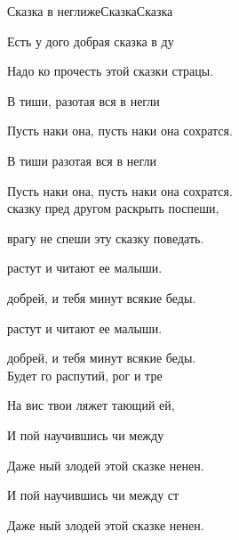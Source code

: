 \documentclass[11pt,a5paper]{book}
\renewcommand{\tt}{\indent \indent}
\begin{document}
\begin{song}{Сказка в неглиже}{}{Сказка}{Сказка}{}{}

Есть у дого добрая сказка в ду\par 
Надо ко прочесть этой сказки страцы.\par
В тиши, разотая вся в негли\par
Пусть наки она, пусть наки она сохратся. \par 
В тиши разотая вся в негли \par
Пусть наки она, пусть наки она сохратся.\\


 сказку пред другом раскрыть поспеши,\par
{} врагу не спеши эту сказку поведать.\par
{} растут и читают ее малыши.\par
{} добрей, и тебя минут всякие беды.\par
{} растут и читают ее малыши.\par
{} добрей, и тебя минут всякие беды.\\


Будет го распутий, рог и тре\par
На вис твои ляжет тающий ей, \par
И пой научившись чи между  \par
Даже ный злодей  этой сказке ненен. \par
И пой научившись чи между ст \par
Даже ный злодей  этой сказке ненен.\\

     \par
{}    
\end{song}
\end{document}
